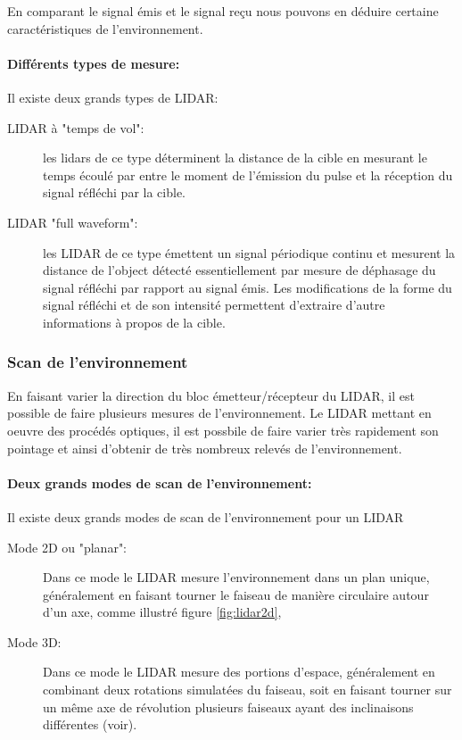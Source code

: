 \documentclass[12pt,a4paper]{report}
\begin{document}
		\para En comparant le signal émis et le signal reçu nous pouvons en déduire certaine caractéristiques de l'environnement.
		
		\paragraph*{Différents types de mesure: } Il existe deux grands types de LIDAR: \begin{description}
			\item[LIDAR  à "temps de vol":] les lidars de ce type déterminent la distance de la cible en mesurant le temps écoulé par entre le moment de l'émission du pulse et la réception du signal réfléchi par la cible.
			\item[LIDAR  "full waveform":] les LIDAR de ce type émettent un signal périodique continu et mesurent la distance de l'object détecté essentiellement par mesure de déphasage du signal réfléchi par rapport au signal émis. Les modifications de la forme du signal réfléchi et de son intensité permettent d'extraire d'autre informations à propos de la cible. 
		\end{description} 
		
		\subsubsection{Scan de l'environnement}
		En faisant varier la direction du bloc émetteur/récepteur du LIDAR, il est possible de faire plusieurs mesures de l'environnement. Le LIDAR mettant en oeuvre des procédés optiques, il est possbile de faire varier très rapidement son pointage et ainsi d'obtenir de très nombreux relevés de l'environnement.
		
		\paragraph*{Deux grands modes de scan de l'environnement:} Il existe deux grands modes de scan de l'environnement pour un LIDAR
		
		\begin{description}
			\item[Mode 2D ou  "planar":] Dans ce mode le LIDAR mesure l'environnement dans un plan unique, généralement en faisant tourner le faiseau de manière circulaire autour d'un axe, comme illustré figure \ref{fig:lidar2d},
			\item[Mode 3D:] Dans ce mode le LIDAR mesure des portions d'espace, généralement en combinant deux rotations simulatées du faiseau, soit en faisant tourner sur un même axe de révolution plusieurs faiseaux ayant des inclinaisons différentes (voir).
		\end{description}
	
\end{document}
